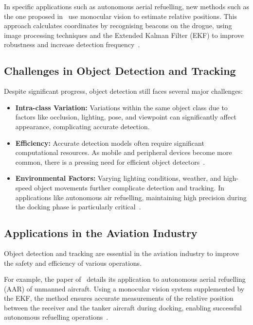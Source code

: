\documentclass[12pt,oneside]{book} %
\begin{document}
In specific applications such as autonomous aerial refuelling, new methods such
as the one proposed in~\citet{AAREKF} use monocular vision to estimate relative
positions. This approach calculates coordinates by recognising beacons on the
drogue, using image processing techniques and the Extended Kalman Filter (EKF)
to improve robustness and increase detection frequency~\cite{AAREKF}.

\subsection{Challenges in Object Detection and Tracking}
Despite significant progress, object detection still faces several major
challenges:

\begin{itemize}
    \item \textbf{Intra-class Variation:} Variations within the same object class due to factors like occlusion, lighting, pose, and viewpoint can significantly affect appearance, complicating accurate detection.
    \item \textbf{Efficiency:} Accurate detection models often require significant computational resources. As mobile and peripheral devices become more common, there is a pressing need for efficient object detectors~\cite{SurveyModernODModels}.
    \item \textbf{Environmental Factors:} Varying lighting conditions, weather, and high-speed object movements further complicate detection and tracking. In applications like autonomous air refuelling, maintaining high precision during the docking phase is particularly critical~\cite{AAREKF}.
\end{itemize}

\subsection{Applications in the Aviation Industry}

Object detection and tracking are essential in the aviation industry to improve
the safety and efficiency of various operations.

For example, the paper of~\citet{AAREKF} details its application to autonomous
aerial refuelling (AAR) of unmanned aircraft. Using a monocular vision system
supplemented by the EKF, the method ensures accurate measurements of the
relative position between the receiver and the tanker aircraft during docking,
enabling successful autonomous refuelling operations~\cite{AAREKF}.
\end{document}
